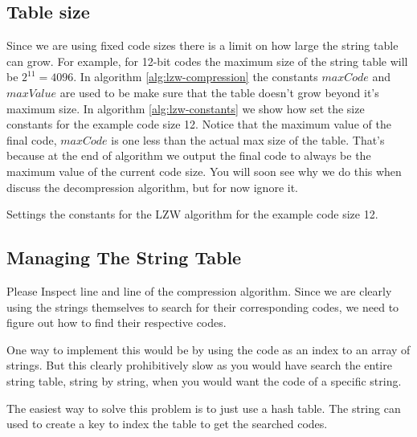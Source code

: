 \subsection{Table size}

Since we are using fixed code sizes there is a limit on how large the
string table can grow. For example, for 12-bit codes the maximum size
of the string table will be $2^{11}=4096$. In algorithm
\ref{alg:lzw-compression} the constants $maxCode$ and $maxValue$ are
used to be make sure that the table doesn't grow beyond it's maximum
size. In algorithm \ref{alg:lzw-constants} we show how set the size
constants for the example code size 12. Notice that the maximum value
of the final code, $maxCode$ is one less than the actual max size of
the table. That's because at the end of algorithm we output the final
code to always be the maximum value of the current code size. You will
soon see why we do this when discuss the decompression algorithm, but for
now ignore it.

\begin{algorithm}[H]
  \caption{Settings the constants for the LZW algorithm for the
    example code size 12.}
  \label{alg:lzw-constants}
  \begin{algorithmic}[1]
  \end{algorithmic}
\end{algorithm}

\subsection{Managing The String Table}

Please Inspect line
 and line
 of the compression
algorithm. Since we are clearly using the strings themselves to search
for their corresponding codes, we need to figure out how to find their
respective codes.

One way to implement this would be by using the code as an index to an
array of strings. But this clearly prohibitively slow as you would
have search the entire string table, string by string, when you would
want the code of a specific string.

The easiest way to solve this problem is to just use a hash table. The
string can used to create a key to index the table to get the searched
codes.

